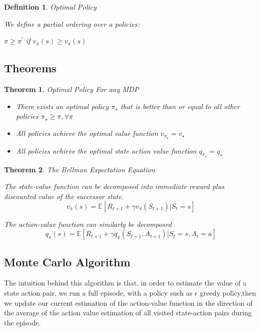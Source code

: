 \documentclass[12pt,a4paper]{article}
\newtheorem{definition}{Definition}
\newtheorem{theorem}{Theorem}
\begin{document}
\begin{definition}{Optimal Policy}

We define a partial ordering over a policies:

$\pi \geq \pi^{\prime}$ if $v_{\pi}(s) \geq  v_{\pi}(s)$

\end{definition}

\subsection{Theorems}

\begin{theorem}{Optimal Policy}
For any MDP
\begin{itemize}
\item There exists an optimal policy $\pi_{\star}$ that is better than or equal to all other policies $\pi_{\star} \geq \pi,\forall\pi $
\item All policies achieve the optimal value function $v_{\pi_{\star}} = v_{\star}$
\item All policies achieve the optimal state action value function $q_{\pi_{\star}} = q_{\star}$
\end{itemize}
\end{theorem}

\begin{theorem}{The Bellman Expectation Equation}

The state-value function can be decomposed into immediate reward plus discounted value of the successor state.
\[ 
v_{\pi}(s) = \mathbb{E}[R_{t+1} + \gamma v_{\pi}(S_{t+1})  \vert S_{t}=s]
\]

The action-value function can similarly be decomposed
\[ 
q_{\pi}(s) = \mathbb{E}[R_{t+1} + \gamma q_{\pi}(S_{t+1}, A_{t+1}) \vert S_{t}=s, A_{t}=a]
\]


\end{theorem}

\subsection{Monte Carlo Algorithm}

The intuition behind this algorithm is that, in order to estimate the value of a state action pair, we run a full episode, with a policy such as $\epsilon$ greedy policy,then we update our current estimation of the action-value function in the direction of the average of the action value estimation of all visited state-action pairs during the episode.
\end{document}
